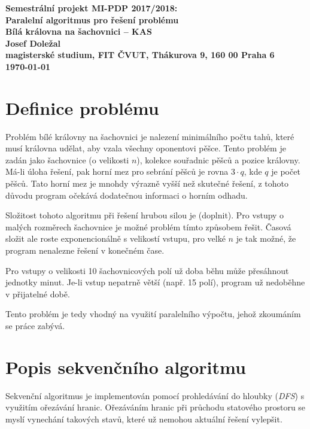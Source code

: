 \documentclass[czech]{article}
\begin{document}
\begin{center}\large
\bf Semestrální projekt MI-PDP 2017/2018:\\[6mm]
    Paralelní algoritmus pro řešení problému\\[3mm]
    Bílá královna na šachovnici -- KAS\\[6mm]
    Josef Doležal\\[2mm]
    magisterské studium, FIT ČVUT, Thákurova 9, 160 00 Praha 6\\[2mm]
    \today
\end{center}

\thispagestyle{empty}
\newpage

\section{Definice problému}

Problém bílé královny na šachovnici je nalezení minimálního počtu tahů, které musí královna udělat, aby vzala všechny oponentovi pěšce.
Tento problém je zadán jako šachovnice (o velikosti $n$), kolekce souřadnic pěšců a pozice královny.
Má-li úloha řešení, pak horní mez pro sebrání pěšců je rovna $3 \cdot q$, kde $q$ je počet pěšců.
Tato horní mez je mnohdy výrazně vyšší než skutečné řešení, z tohoto důvodu program očekává dodatečnou informaci o horním odhadu.

Složitost tohoto algoritmu při řešení hrubou silou je (doplnit).
Pro vstupy o malých rozměrech šachovnice je možné problém tímto způsobem řešit.
Časová složit ale roste exponencionálně s velikostí vstupu, pro velké $n$ je tak možné, že program nenalezne řešení v konečném čase.

Pro vstupy o velikosti 10 šachovnicových polí už doba běhu může přesáhnout jednotky minut.
Je-li vstup nepatrně větší (např. 15 polí), program už nedoběhne v přijatelné době.

Tento problém je tedy vhodný na využití paralelního výpočtu, jehož zkoumáním se práce zabývá.

\section{Popis sekvenčního algoritmu}

Sekvenční algoritmus je implementován pomocí prohledávání do hloubky (\textit{DFS}) s využitím ořezávání hranic.
Ořezáváním hranic při průchodu statového prostoru se myslí vynechání takových stavů, které už nemohou aktuální řešení vylepšit.
\end{document}
